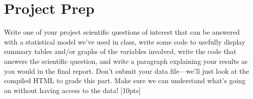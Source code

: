 \documentclass[12pt]{article}
\begin{document}
\section{Project Prep}

Write one of your project scientific questions of interest that can be answered with a statistical model we've used in class, write some code to usefully display summary tables and/or graphs of the variables involved, write the code that answers the scientific question, and write a paragraph explaining your results as you would in the final report. Don't submit your data file---we'll just look at the compiled HTML to grade this part. Make sure we can understand what's going on without having access to the data! [10pts]
\end{document}
